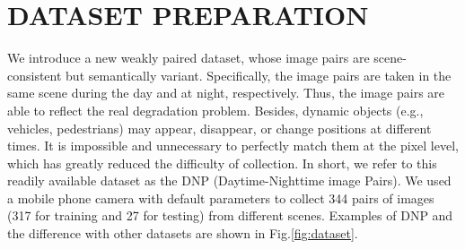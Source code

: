 \documentclass{article}
\begin{document}
\section{DATASET PREPARATION} \label{sec:dataset}

We introduce a new weakly paired dataset, whose image pairs are scene-consistent but semantically variant. Specifically, the image pairs are taken in the same scene during the day and at night, respectively. Thus, the image pairs are able to reflect the real degradation problem. Besides, dynamic objects (e.g., vehicles, pedestrians) may appear, disappear, or change positions at different times. It is impossible and unnecessary to perfectly match them at the pixel level, which has greatly reduced the difficulty of collection. In short, we refer to this readily available dataset as the DNP (Daytime-Nighttime image Pairs). We used a mobile phone camera with default parameters to collect 344 pairs of images (317 for training and 27 for testing) from different scenes. Examples of DNP and the difference with other datasets are shown in Fig.\ref{fig:dataset}.
\end{document}
